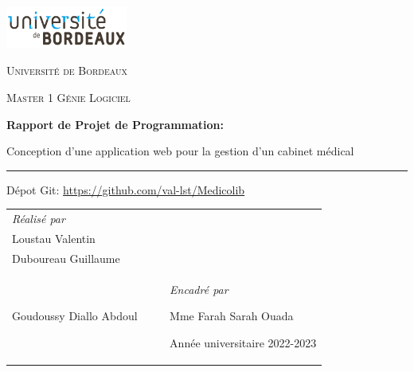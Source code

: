 \documentclass[a4paper]{report}
\begin{document}
\begin{titlepage}
    \centering
    
    \includegraphics[width=0.3\textwidth]{logo/logo_univ_bordeaux.png}\par\vspace{1cm}
    
    {\scshape\LARGE Université de Bordeaux\par}
    \vspace{1cm}
    {\scshape\Large Master 1 Génie Logiciel\par}
    \vspace{3cm}
    {\Large\bfseries Rapport de Projet de Programmation:\par}
    \vspace{1cm}
    {\Huge {Conception d'une application web pour la gestion d'un cabinet médical}\par}

    \vspace{1cm}
    \noindent\rule{0.6\textwidth}{0.7pt}
    \vspace{0.5cm}

    Dépot Git: \url{https://github.com/val-lst/Medicolib}

    \vspace{4cm}
    \begin{tabular}{@{}p{0.5\linewidth}p{0.5\linewidth}@{}}
    \raggedright
    {\large\itshape Réalisé par\par}
    \vspace{0.5cm}
    {\Large Ephrem Jennifer\\Loustau Valentin\\Duboureau Guillaume\\Goudoussy Diallo Abdoul\par}
    &
    \vspace{1cm}
    \raggedleft
    {\large\itshape Encadré par\par}
    {\Large Mme Farah Sarah Ouada\par}
    \vspace{0.5cm}

    {\large Année universitaire 2022-2023\par}
    \end{tabular}
    
\end{titlepage}
\let\cleardoublepage\clearpage
\tableofcontents
\newpage
\listoffigures
\end{document}
